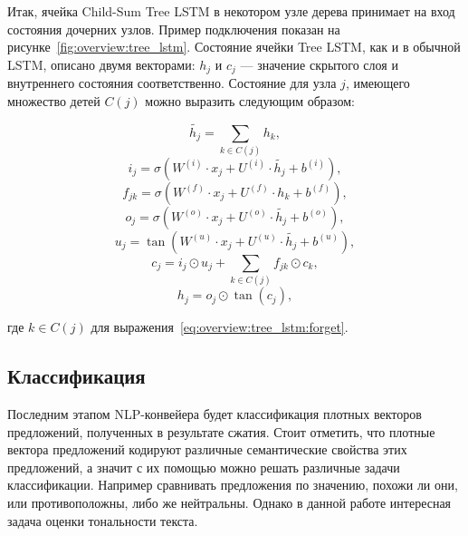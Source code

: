 Итак, ячейка Child-Sum Tree LSTM в некотором узле дерева принимает на вход состояния дочерних узлов. Пример подключения показан на рисунке~\ref{fig:overview:tree_lstm}. Состояние ячейки Tree LSTM, как и в обычной LSTM, описано двумя векторами: $h_j$ и $c_j$ --- значение скрытого слоя и внутреннего состояния соответственно. Состояние для узла $j$, имеющего множество детей $C(j)$ можно выразить следующим образом:

\begin{equation}
  \tilde{h_j} = \sum_{k\in{C(j)}}h_k,
\end{equation}
\begin{equation}
  i_j = \sigma(W^{(i)}\cdot{x_j} + U^{(i)}\cdot{\tilde{h_j}} + b^{(i)}),
\end{equation}
\begin{equation}
  \label{eq:overview:tree_lstm:forget}
  f_{jk} = \sigma(W^{(f)}\cdot{x_j} + U^{(f)}\cdot{h_k} + b^{(f)}),
\end{equation}
\begin{equation}
  o_j = \sigma(W^{(o)}\cdot{x_j} + U^{(o)}\cdot{\tilde{h_j}} + b^{(o)}),
\end{equation}
\begin{equation}
  u_j = \tan(W^{(u)}\cdot{x_j} + U^{(u)}\cdot{\tilde{h_j}} + b^{(u)}),
\end{equation}
\begin{equation}
  c_j = i_j\odot{u_j} + \sum_{k\in{C(j)}}f_{jk}\odot{c_k},
\end{equation}
\begin{equation}
  h_j = o_j\odot{\tan(c_j)},
\end{equation}
\begin{explanationx}
\item [где] $k\in{C(j)}$ для выражения~\ref{eq:overview:tree_lstm:forget}.
\end{explanationx}


\subsection{Классификация}
Последним этапом NLP-конвейера будет классификация плотных векторов предложений, полученных в результате сжатия. Стоит отметить, что плотные вектора предложений кодируют различные семантические свойства этих предложений, а значит с их помощью можно решать различные задачи классификации. Например сравнивать предложения по значению, похожи ли они, или противоположны, либо же нейтральны. Однако в данной работе интересная задача оценки тональности текста\cite{Goodfellow-et-al-2016}.

